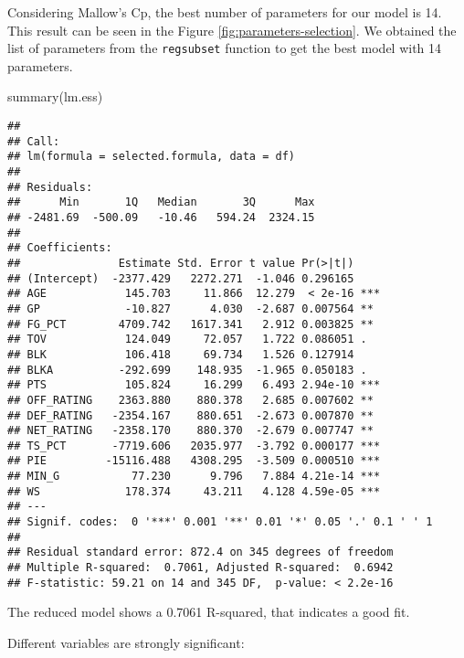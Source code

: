 \documentclass[
]{article}
\newenvironment{Shaded}{\begin{snugshade}}{\end{snugshade}}
\newcommand{\FunctionTok}[1]{\textcolor[rgb]{0.00,0.00,0.00}{#1}}
\newcommand{\NormalTok}[1]{#1}
\begin{document}
Considering Mallow's Cp, the best number of parameters for our model is
14. This result can be seen in the Figure
\ref{fig:parameters-selection}. We obtained the list of parameters from
the \texttt{regsubset} function to get the best model with 14
parameters.

\begin{Shaded}
\begin{Highlighting}[]
\FunctionTok{summary}\NormalTok{(lm.ess)}
\end{Highlighting}
\end{Shaded}

\begin{verbatim}
## 
## Call:
## lm(formula = selected.formula, data = df)
## 
## Residuals:
##      Min       1Q   Median       3Q      Max 
## -2481.69  -500.09   -10.46   594.24  2324.15 
## 
## Coefficients:
##               Estimate Std. Error t value Pr(>|t|)    
## (Intercept)  -2377.429   2272.271  -1.046 0.296165    
## AGE            145.703     11.866  12.279  < 2e-16 ***
## GP             -10.827      4.030  -2.687 0.007564 ** 
## FG_PCT        4709.742   1617.341   2.912 0.003825 ** 
## TOV            124.049     72.057   1.722 0.086051 .  
## BLK            106.418     69.734   1.526 0.127914    
## BLKA          -292.699    148.935  -1.965 0.050183 .  
## PTS            105.824     16.299   6.493 2.94e-10 ***
## OFF_RATING    2363.880    880.378   2.685 0.007602 ** 
## DEF_RATING   -2354.167    880.651  -2.673 0.007870 ** 
## NET_RATING   -2358.170    880.370  -2.679 0.007747 ** 
## TS_PCT       -7719.606   2035.977  -3.792 0.000177 ***
## PIE         -15116.488   4308.295  -3.509 0.000510 ***
## MIN_G           77.230      9.796   7.884 4.21e-14 ***
## WS             178.374     43.211   4.128 4.59e-05 ***
## ---
## Signif. codes:  0 '***' 0.001 '**' 0.01 '*' 0.05 '.' 0.1 ' ' 1
## 
## Residual standard error: 872.4 on 345 degrees of freedom
## Multiple R-squared:  0.7061, Adjusted R-squared:  0.6942 
## F-statistic: 59.21 on 14 and 345 DF,  p-value: < 2.2e-16
\end{verbatim}

The reduced model shows a 0.7061 R-squared, that indicates a good fit.

Different variables are strongly significant:
\end{document}
